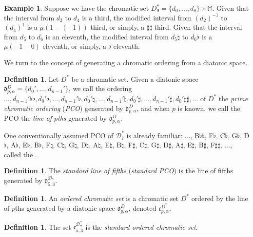 \documentclass{article}
\theoremstyle{plain}
\theoremstyle{definition}
\newtheorem{definition}[theorem]{Definition}
\newtheorem{example}[theorem]{Example}
\theoremstyle{remark}
\begin{document}
\begin{example}
	Suppose we have the chromatic set $D_9^\ast=\{d_0,\dots,d_8\}\times\mathbb{M}$. Given that the interval from $d_2$ to $d_4$ is a third, the modified interval from $(d_2)^{-1}$ to $(d_4)^1$ is a $\mu(1-(-1))$ third, or simply, a $\sharp\sharp$ third. Given that the interval from $d_5$ to $d_6$ is an eleventh, the modified interval from $d_5\natural$ to $d_6\flat$ is a $\mu(-1-0)$ eleventh, or simply, a $\flat$ eleventh.
\end{example}

We turn to the concept of generating a chromatic ordering from a diatonic space.

\begin{definition}
	Let $D^\ast$ be a chromatic set. Given a diatonic space $\mathfrak{d}_{p,\alpha}^D=\{d_0',\dots,d_{n-1}'\}$, we call the ordering $\dots,d_{n-1}'\flat\flat,d_0'\flat,\dots,d_{n-1}'\flat,d_0'\natural,\dots,d_{n-1}'\natural,d_0'\sharp,\dots,d_{n-1}'\sharp,d_0'\sharp\sharp,\dots$ of $D^\ast$ the \textit{prime chromatic ordering} (\textit{PCO}) generated by $\mathfrak{d}_{p,\alpha}^D$, and when $p$ is known, we call the PCO the \textit{line of $p$ths} generated by $\mathfrak{d}_{p,\alpha}^D$.
\end{definition}

One conventionally assumed PCO of $\mathcal{D}_7^\ast$ is already familiar: $\dots$, B$\flat\flat$, F$\flat$, C$\flat$, G$\flat$, D$\flat$, A$\flat$, E$\flat$, B$\flat$, F$\natural$, C$\natural$, G$\natural$, D$\natural$, A$\natural$, E$\natural$, B$\natural$, F$\sharp$, C$\sharp$, G$\sharp$, D$\sharp$, A$\sharp$, E$\sharp$, B$\sharp$, F$\sharp\sharp$, $\dots$, called the  \cite{Temperley}.

\begin{definition}
	The \textit{standard line of fifths} (\textit{standard PCO}) is the line of fifths generated by $\mathfrak{d}_{5,3}^{\mathcal{D}_7}$.
\end{definition}

\begin{definition}
	An \textit{ordered chromatic set} is a chromatic set $D^\ast$ ordered by the line of $p$ths generated by a diatonic space $\mathfrak{d}_{p,\alpha}^{D}$, denoted $\mathfrak{c}_{p,\alpha}^{D^\ast}$.
\end{definition}

\begin{definition}
	The set $\mathfrak{c}_{5,3}^{\mathcal{D}_7^\ast}$ is the \textit{standard ordered chromatic set}.
\end{definition}
\end{document}
